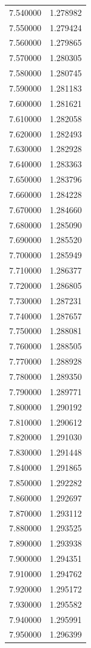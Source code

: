 \begin{tabular}{rr}
7.540000 & 1.278982 \\
7.550000 & 1.279424 \\
7.560000 & 1.279865 \\
7.570000 & 1.280305 \\
7.580000 & 1.280745 \\
7.590000 & 1.281183 \\
7.600000 & 1.281621 \\
7.610000 & 1.282058 \\
7.620000 & 1.282493 \\
7.630000 & 1.282928 \\
7.640000 & 1.283363 \\
7.650000 & 1.283796 \\
7.660000 & 1.284228 \\
7.670000 & 1.284660 \\
7.680000 & 1.285090 \\
7.690000 & 1.285520 \\
7.700000 & 1.285949 \\
7.710000 & 1.286377 \\
7.720000 & 1.286805 \\
7.730000 & 1.287231 \\
7.740000 & 1.287657 \\
7.750000 & 1.288081 \\
7.760000 & 1.288505 \\
7.770000 & 1.288928 \\
7.780000 & 1.289350 \\
7.790000 & 1.289771 \\
7.800000 & 1.290192 \\
7.810000 & 1.290612 \\
7.820000 & 1.291030 \\
7.830000 & 1.291448 \\
7.840000 & 1.291865 \\
7.850000 & 1.292282 \\
7.860000 & 1.292697 \\
7.870000 & 1.293112 \\
7.880000 & 1.293525 \\
7.890000 & 1.293938 \\
7.900000 & 1.294351 \\
7.910000 & 1.294762 \\
7.920000 & 1.295172 \\
7.930000 & 1.295582 \\
7.940000 & 1.295991 \\
7.950000 & 1.296399 \\

\end{tabular}
